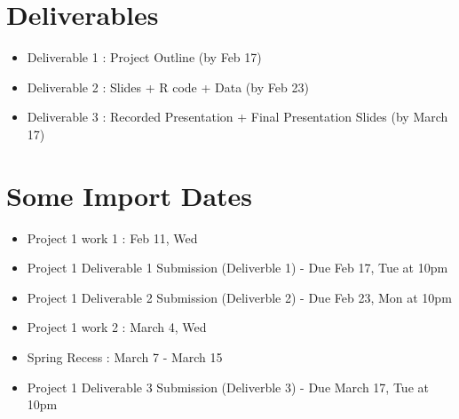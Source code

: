 \documentclass[12pt]{article}
\begin{document}
\section*{Deliverables}
\begin{itemize}
    \item Deliverable 1 : Project Outline (by Feb 17) 
    \item Deliverable 2 : Slides + R code + Data (by Feb 23)
    \item Deliverable 3 : Recorded Presentation + Final Presentation Slides (by March 17)
\end{itemize}

\section*{Some Import Dates}
\begin{itemize}
    \item Project 1 work 1 : Feb 11, Wed
    \item Project 1 Deliverable 1 Submission (Deliverble 1) - Due Feb 17, Tue at 10pm
    \item Project 1 Deliverable 2 Submission (Deliverble 2) - Due Feb 23, Mon at 10pm
    \item Project 1 work 2 : March 4, Wed
    \item Spring Recess : March 7 - March 15
    \item Project 1 Deliverable 3 Submission (Deliverble 3) - Due March 17, Tue at 10pm
\end{itemize}
\end{document}
